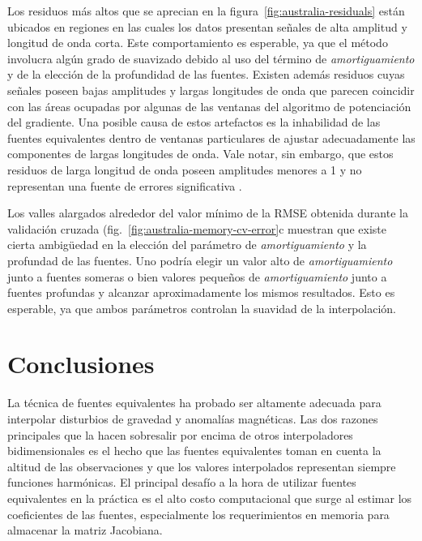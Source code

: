 Los residuos más altos que se aprecian en la figura~\ref{fig:australia-residuals}
están ubicados en regiones en las cuales los datos presentan señales de alta
amplitud y longitud de onda corta.
Este comportamiento es esperable, ya que el método involucra algún grado de
suavizado debido al uso del término de \emph{amortiguamiento} y de la elección
de la profundidad de las fuentes.
Existen además residuos cuyas señales poseen bajas amplitudes y largas
longitudes de onda que parecen coincidir con las áreas ocupadas por algunas de
las ventanas del algoritmo de potenciación del gradiente.
Una posible causa de estos artefactos es la inhabilidad de las fuentes
equivalentes dentro de ventanas particulares de ajustar adecuadamente
las componentes de largas longitudes de onda.
Vale notar, sin embargo, que estos residuos de larga longitud de onda poseen
amplitudes menores a 1\mGal{} y no representan una fuente de errores
significativa .

Los valles alargados alrededor del valor mínimo de la \ac{RMSE} obtenida
durante la validación cruzada (fig.~\ref{fig:australia-memory-cv-error}c
muestran que existe cierta ambigüedad en la elección del parámetro de
\emph{amortiguamiento} y la profundad de las fuentes.
Uno podría elegir un valor alto de \emph{amortiguamiento} junto a fuentes
someras o bien valores pequeños de \emph{amortiguamiento} junto a fuentes
profundas y alcanzar aproximadamente los mismos resultados.
Esto es esperable, ya que ambos parámetros controlan la suavidad de la
interpolación.


\section{Conclusiones}

La técnica de fuentes equivalentes ha probado ser altamente adecuada para
interpolar disturbios de gravedad y anomalías magnéticas.
Las dos razones principales que la hacen sobresalir por encima de otros
interpoladores bidimensionales es el hecho que las fuentes equivalentes toman
en cuenta la altitud de las observaciones y que los valores interpolados
representan siempre funciones harmónicas.
El principal desafío a la hora de utilizar fuentes equivalentes en la práctica
es el alto costo computacional que surge al estimar los coeficientes de las
fuentes, especialmente los requerimientos en memoria para almacenar la matriz
Jacobiana.

